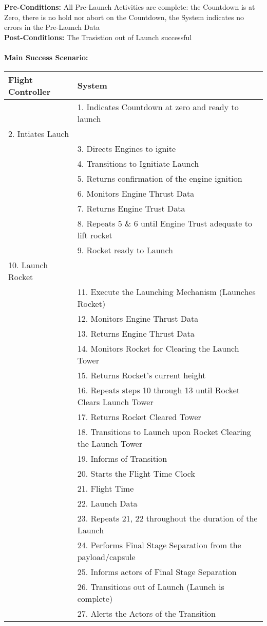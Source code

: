 \documentclass[letterpaper]{article}
\begin{document}
\textbf{Pre-Conditions:  }All Pre-Launch Activities are complete:  the
Countdown is at Zero, there is no hold nor abort on the Countdown, the
System indicates no errors in the Pre-Launch Data\\
\textbf{Post-Conditions:  }The Trasistion out of Launch successful\\\\
\textbf{Main Success Scenario:  }\\
\begin{tabular}{|p{5.75cm}|p{5.75cm}|}\hline
\textbf{Flight Controller} & \textbf{System}\\\hline
&1.  Indicates Countdown at zero and ready to launch\\\hline
2. Intiates Lauch & \\\hline
& 3.  Directs Engines to ignite\\\hline
& 4.  Transitions to Ignitiate Launch\\\hline
& 5.  Returns confirmation of the engine ignition\\\hline
& 6.  Monitors Engine Thrust Data\\\hline
& 7.  Returns Engine Trust Data\\\hline
& 8.  Repeats 5 \& 6 until Engine Trust adequate to lift
rocket\\\hline
& 9.  Rocket ready to Launch\\\hline
10. Launch Rocket &\\\hline
& 11.   Execute the Launching Mechanism (Launches Rocket)\\\hline
& 12.  Monitors Engine Thrust Data\\\hline
& 13.  Returns Engine Thrust Data\\\hline
& 14.  Monitors Rocket for Clearing the Launch Tower\\\hline
& 15.  Returns Rocket's current height\\\hline
& 16.  Repeats steps 10 through 13 until Rocket Clears Launch
Tower\\\hline
& 17.  Returns Rocket Cleared Tower\\\hline
& 18.  Transitions to Launch upon Rocket Clearing the Launch
Tower\\\hline
& 19.  Informs of Transition\\\hline 
& 20.  Starts the Flight Time Clock\\\hline
& 21.  Flight Time\\\hline
& 22.  Launch Data\\\hline
& 23.  Repeats 21, 22 throughout the duration of the Launch\\\hline
& 24.  Performs Final Stage Separation from the payload/capsule\\\hline
& 25.  Informs actors of Final Stage Separation\\\hline
& 26. Transitions out of Launch (Launch is complete)\\\hline
& 27. Alerts the Actors of the Transition\\\hline
\end{tabular}\\\\
\end{document}
